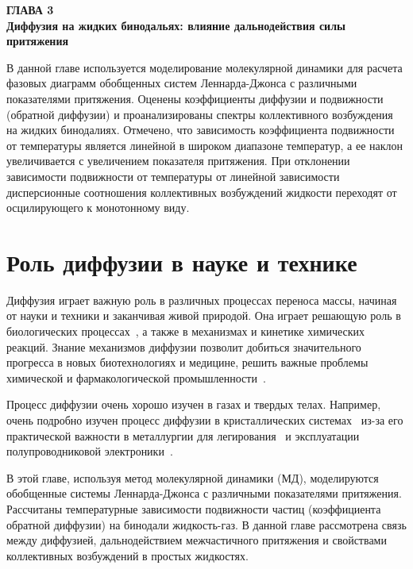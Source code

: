
\newpage
\begin{center}
\textbf{\large ГЛАВА 3 \\ Диффузия на жидких бинодальях: влияние дальнодействия силы притяжения}
\end{center}


В данной главе используется моделирование молекулярной динамики для расчета фазовых диаграмм обобщенных систем Леннарда-Джонса с различными показателями притяжения. Оценены коэффициенты диффузии и подвижности (обратной диффузии) и проанализированы спектры коллективного возбуждения на жидких бинодалиях. Отмечено, что зависимость коэффициента подвижности от температуры является линейной в широком диапазоне температур, а ее наклон увеличивается с увеличением показателя притяжения. При отклонении зависимости подвижности от температуры от линейной зависимости дисперсионные соотношения коллективных возбуждений жидкости переходят от осцилирующего к монотонному виду.

\section{Роль диффузии в науке и технике}
\label{MACR-SecIntroduction}

Диффузия играет важную роль в различных процессах переноса массы, начиная от науки и техники и заканчивая живой природой.
Она играет решающую роль в биологических процессах~\cite{10.1016/j.bbagen.2013.09.037, 10.1038/s41598-018-22643-9}, а также в механизмах и кинетике химических реакций. Знание механизмов диффузии позволит добиться значительного прогресса в новых биотехнологиях и медицине, решить важные проблемы химической и фармакологической промышленности~\cite{10.1002/3527602836}.

Процесс диффузии очень хорошо изучен в газах и твердых телах. Например, очень подробно изучен процесс диффузии в кристаллических системах~\cite{10.1016/0079-6816(95)00039-2} из-за его практической важности в металлургии для легирования~\cite{10.1016/s0924-0136(96)02826-9, 10.1016/j.actamat.2015.10.010, 10.1134/s1063783411110308} и эксплуатации полупроводниковой электроники~\cite{10.1103/physrevlett.84.4220, 10.1016/j.physrep.2009.10.003}.

В этой главе, используя метод молекулярной динамики (МД), моделируются обобщенные системы Леннарда-Джонса с различными показателями притяжения. Рассчитаны температурные зависимости подвижности частиц (коэффициента обратной диффузии) на бинодали жидкость-газ. В данной главе рассмотрена связь между диффузией, дальнодействием межчастичного притяжения и свойствами коллективных возбуждений в простых жидкостях.

